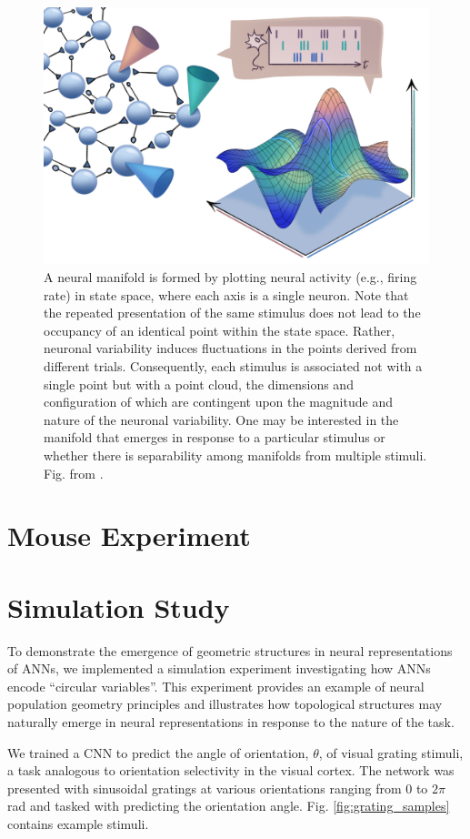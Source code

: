 \documentclass[11pt,a4paper]{article}
\begin{document}
\begin{figure}
    \centering
    \includegraphics[width=0.75\linewidth]{figs/manifold_schematic.png}
    \caption{A neural manifold is formed by plotting neural activity (e.g., firing rate) in state space, where each axis is a single neuron. Note that the repeated presentation of the same stimulus does not lead to the occupancy of an identical point within the state space. Rather, neuronal variability induces fluctuations in the points derived from different trials. Consequently, each stimulus is associated not with a single point but with a point cloud, the dimensions and configuration of which are contingent upon the magnitude and nature of the neuronal variability. One may be interested in the manifold that emerges in response to a particular stimulus or whether there is separability among manifolds from multiple stimuli. Fig. from \cite{Perich2024}.}
    \label{fig:manifolds}
\end{figure}


\section{Mouse Experiment}

\section{Simulation Study}

To demonstrate the emergence of geometric structures in neural representations of ANNs, we implemented a simulation experiment investigating how ANNs encode ``circular variables''. This experiment provides an example of neural population geometry principles and illustrates how topological structures may naturally emerge in neural representations in response to the nature of the task.


We trained a CNN to predict the angle of orientation, $\theta$, of visual grating stimuli, a task analogous to orientation selectivity in the visual cortex. The network was presented with sinusoidal gratings at various orientations ranging from 0 to $2\pi$ rad and tasked with predicting the orientation angle. Fig. \ref{fig:grating_samples} contains example stimuli.
\end{document}
